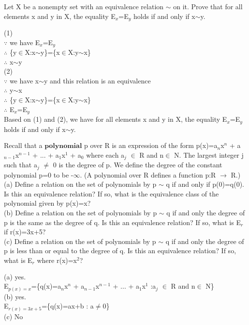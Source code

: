 \documentclass[11pt, a4paper, UTF8]{ctexart}
\begin{document}
\begin{problem}[UD:10.5]
Let X be a nonempty set with an equivalence relation $\sim$ on it. Prove that for all elements x and y in X, the equality E$_x$=E$_y$ holds if and only if x$\sim$y.
\end{problem}
\begin{solution}
(1)\\
$\because$ we have E$_x$=E$_y$\\
$\therefore$ \{y$\in$X:x$\sim$y\}=\{x$\in$X:y$\sim$x\}\\
$\therefore$  x$\sim$y\\
(2)\\
$\because$ we have x$\sim$y and this relation is an equivalence\\
$\therefore$ y$\sim$x\\
$\therefore$ \{y$\in$X:x$\sim$y\}=\{x$\in$X:y$\sim$x\}\\
$\therefore$ E$_x$=E$_y$\\
Based on (1) and (2), we have for all elements x and y in X, the equality E$_x$=E$_y$ holds if and only if x$\sim$y.
\end{solution}


\begin{problem}[UD:10.8]
Recall that a $\boldsymbol{polynomial}$ p over R is an expression of the form p(x)=a$_n$x$^n$ + a$_{n-1}$x$^{n-1}$ + ... + a$_1$x$^1$ + a$_0$ where each a$_j$ $\in$ R and n$\in$ N. The largest integer j such that a$_j$ $\not=$ 0 is the degree of p. We define the degree of the constant polynomial p=0 to be -$\infty$. (A polynomial over R defines a function p:R $\rightarrow$ R.)\\
(a) Define a relation on the set of polynomials by p $\sim$ q if and only if p(0)=q(0). Is this an equivalence relation? If so, what is the equivalence class of the polynomial given by p(x)=x?\\
(b) Define a relation on the set of polynomials by p $\sim$ q if and only the degree of p is the same as the degree of q. Is this an equivalence relation? If so, what is E$_r$ if r(x)=3x+5?\\
(c) Define a relation on the set of polynomials by p $\sim$ q if and only the degree of p is less than or equal to the degree of q. Is this an equivalence relation? If so, what is E$_r$ where r(x)=x$^2$?\\
\end{problem}
\begin{solution}
(a) yes.\\
E$_{p(x)=x}$=\{q(x)=a$_n$x$^n$ + a$_{n-1}$x$^{n-1}$ + ... + a$_1$x$^1$ :a$_j$ $\in$ R and n$\in$ N\}\\
(b) yes.\\
E$_{r(x)=3x+5}$=\{q(x)=ax+b : a$\not=$0\}\\
(c) No\\
\end{solution}
\end{document}
